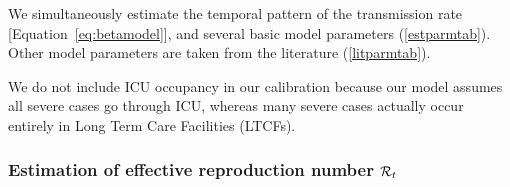 \documentclass[12pt]{article}\usepackage[]{graphicx}\usepackage[]{color}
\begin{document}

We simultaneously estimate the temporal pattern of the transmission
rate [Equation~\eqref{eq:betamodel}], and several basic model
parameters (\cref{estparmtab}).  Other model parameters
are taken from the literature (\cref{litparmtab}).

We do not include ICU occupancy in our calibration because
our model assumes all severe cases go through ICU, whereas
many severe cases actually occur entirely in Long Term Care Facilities
(LTCFs).  

\hypertarget{Rt}{}
\subsubsection*{Estimation of effective reproduction number ${\mathcal R}_t$}
\end{document}
